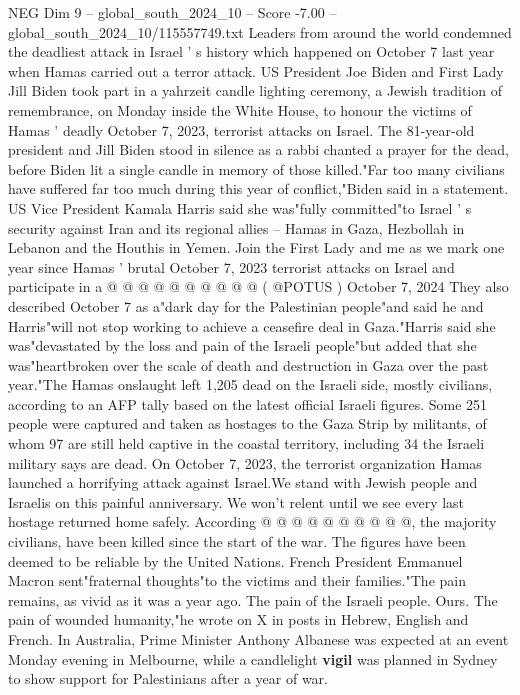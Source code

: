 \begin{textsample}{NEG Dim 9 – global\_south\_2024\_10 – Score -7.00 – global\_south\_2024\_10/115557749.txt}  \label{ex:f9_neg_271}
Leaders from around the world condemned the deadliest attack in Israel ' s history which happened on October 7 last year when Hamas carried out a terror attack.
US President Joe Biden and First Lady Jill Biden took part in a yahrzeit candle lighting ceremony, a Jewish tradition of remembrance, on Monday inside the White House, to honour the victims of Hamas ' deadly October 7, 2023, terrorist attacks on Israel.
The 81-year-old president and Jill Biden stood in silence as a rabbi chanted a prayer for the dead, before Biden lit a single candle in memory of those killed."Far too many civilians have suffered far too much during this year of conflict,"Biden said in a statement.
US Vice President Kamala Harris said she was"fully committed"to Israel ' s security against Iran and its regional allies -- Hamas in Gaza, Hezbollah in Lebanon and the Houthis in Yemen.
Join the First Lady and me as we mark one year since Hamas ' brutal October 7, 2023 terrorist attacks on Israel and participate in a @ @ @ @ @ @ @ @ @ @ ( @POTUS ) October 7, 2024 They also described October 7 as a"dark day for the Palestinian people"and said he and Harris"will not stop working to achieve a ceasefire deal in Gaza."Harris said she was"devastated by the loss and pain of the Israeli people"but added that she was"heartbroken over the scale of death and destruction in Gaza over the past year."The Hamas onslaught left 1,205 dead on the Israeli side, mostly civilians, according to an AFP tally based on the latest official Israeli figures.
Some 251 people were captured and taken as hostages to the Gaza Strip by militants, of whom 97 are still held captive in the coastal territory, including 34 the Israeli military says are dead.
On October 7, 2023, the terrorist organization Hamas launched a horrifying attack against Israel.We stand with Jewish people and Israelis on this painful anniversary.
We won't relent until we see every last hostage returned home safely.
According @ @ @ @ @ @ @ @ @ @, the majority civilians, have been killed since the start of the war.
The figures have been deemed to be reliable by the United Nations.
French President Emmanuel Macron sent"fraternal thoughts"to the victims and their families."The pain remains, as vivid as it was a year ago.
The pain of the Israeli people.
Ours.
The pain of wounded humanity,"he wrote on X in posts in Hebrew, English and French.
In Australia, Prime Minister Anthony Albanese was expected at an event Monday evening in Melbourne, while a candlelight \textbf{vigil} was planned in Sydney to show support for Palestinians after a year of war.

\end{textsample}
